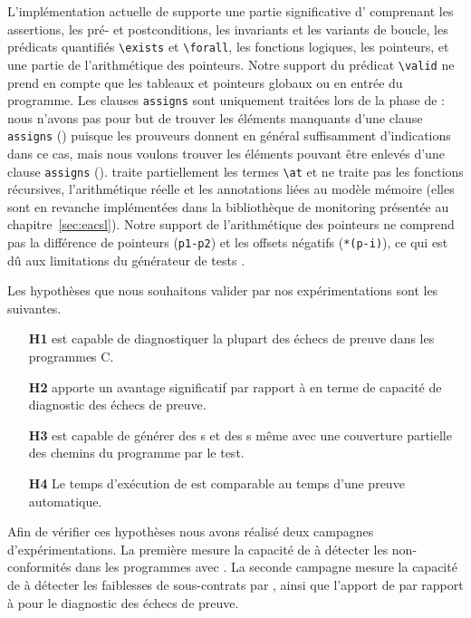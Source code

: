 L'implémentation actuelle de \stady supporte une partie significative d'\eacsl
comprenant les assertions, les pré- et postconditions, les invariants et les
variants de boucle, les prédicats quantifiés \lstinline[style=c]'\exists' et
\lstinline[style=c]'\forall', les fonctions logiques, les pointeurs, et une
partie de l'arithmétique des pointeurs.
Notre support du prédicat \lstinline'\valid' ne prend en compte que les tableaux
et pointeurs globaux ou en entrée du programme.
Les clauses \lstinline'assigns' sont uniquement traitées lors de la phase de
\SWD : nous n'avons pas pour but de trouver les éléments manquants d'une clause
\lstinline'assigns' (\NCD) puisque les prouveurs donnent en général
suffisamment d'indications dans ce cas, mais nous voulons trouver les éléments
pouvant être enlevés d'une clause \lstinline'assigns' (\SWD).
\stady traite partiellement les termes \lstinline'\at' et ne traite pas les
fonctions récursives, l'arithmétique réelle et les annotations liées au modèle
mémoire (elles sont en revanche implémentées dans la bibliothèque de monitoring
présentée au chapitre~\ref{sec:eacsl}).
Notre support de l'arithmétique des pointeurs ne comprend pas la différence de
pointeurs (\lstinline'p1-p2') et les offsets négatifs (\lstinline'*(p-i)'), ce
qui est dû aux limitations du générateur de tests \pathcrawler.

Les hypothèses que nous souhaitons valider par nos expérimentations sont les
suivantes.

\begin{itemize}
\item[\textbf{H1}]
  \stady est capable de diagnostiquer la plupart des échecs de preuve dans les
  programmes C.

\item[\textbf{H2}]
  \SWD apporte un avantage significatif par rapport à \NCD en terme de capacité
  de diagnostic des échecs de preuve.

\item[\textbf{H3}]
  \stady est capable de générer des \NCCE{}s et des \SWCE{}s même avec une
  couverture partielle des chemins du programme par le test.

\item[\textbf{H4}]
  Le temps d'exécution de \stady est comparable au temps d'une preuve
  automatique.
\end{itemize}

Afin de vérifier ces hypothèses nous avons réalisé deux campagnes
d'expérimentations.
La première mesure la capacité de \stady à détecter les non-conformités dans les
programmes avec \NCD.
La seconde campagne mesure la capacité de \stady à détecter les faiblesses de
sous-contrats par \SWD, ainsi que l'apport de \SWD par rapport à \NCD pour le
diagnostic des échecs de preuve.

